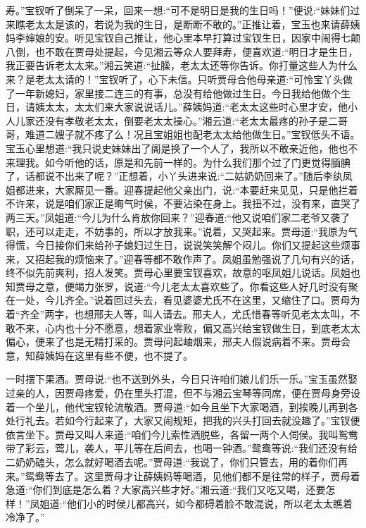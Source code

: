 \begin{parag}
寿。”宝钗听了倒呆了一呆，回来一想:“可不是明日是我的生日吗！”便说:“妹妹们过来瞧老太太是该的，若说为我的生日，是断断不敢的。”正推让着，宝玉也来请薛姨妈李婶娘的安。听见宝钗自己推让，他心里本早打算过宝钗生日，因家中闹得七颠八倒，也不敢在贾母处提起，今见湘云等众人要拜寿，便喜欢道:“明日才是生日，我正要告诉老太太来。”湘云笑道:“扯臊，老太太还等你告诉。你打量这些人为什么来？是老太太请的！”宝钗听了，心下未信。只听贾母合他母亲道:“可怜宝丫头做了一年新媳妇，家里接二连三的有事，总没有给他做过生日。今日我给他做个生日，请姨太太，太太们来大家说说话儿。”薛姨妈道:“老太太这些时心里才安，他小人儿家还没有孝敬老太太，倒要老太太操心。”湘云道:“老太太最疼的孙子是二哥哥，难道二嫂子就不疼了么！况且宝姐姐也配老太太给他做生日。”宝钗低头不语。宝玉心里想道:“我只说史妹妹出了阁是换了一个人了，我所以不敢亲近他，他也不来理我。如今听他的话，原是和先前一样的。为什么我们那个过了门更觉得腼腆了，话都说不出来了呢？”正想着，小丫头进来说:“二姑奶奶回来了。”随后李纨凤姐都进来，大家厮见一番。迎春提起他父亲出门，说:“本要赶来见见，只是他拦着不许来，说是咱们家正是晦气时侯，不要沾染在身上。我扭不过，没有来，直哭了两三天。”凤姐道:“今儿为什么肯放你回来？”迎春道:“他又说咱们家二老爷又袭了职，还可以走走，不妨事的，所以才放我来。”说着，又哭起来。贾母道:“我原为气得慌，今日接你们来给孙子媳妇过生日，说说笑笑解个闷儿。你们又提起这些烦事来，又招起我的烦恼来了。”迎春等都不敢作声了。凤姐虽勉强说了几句有兴的话，终不似先前爽利，招人发笑。贾母心里要宝钗喜欢，故意的呕凤姐儿说话。凤姐也知贾母之意，便竭力张罗，说道:“今儿老太太喜欢些了。你看这些人好几时没有聚在一处，今儿齐全。”说着回过头去，看见婆婆尤氏不在这里，又缩住了口。贾母为着“齐全”两字，也想邢夫人等，叫人请去。邢夫人，尤氏惜春等听见老太太叫，不敢不来，心内也十分不愿意，想着家业零败，偏又高兴给宝钗做生日，到底老太太偏心，便来了也是无精打采的。贾母问起岫烟来，邢夫人假说病着不来。贾母会意，知薛姨妈在这里有些不便，也不提了。
\end{parag}


\begin{parag}
    一时摆下果酒。贾母说:“也不送到外头，今日只许咱们娘儿们乐一乐。”宝玉虽然娶过亲的人，因贾母疼爱，仍在里头打混，但不与湘云宝琴等同席，便在贾母身旁设着一个坐儿，他代宝钗轮流敬酒。贾母道:“如今且坐下大家喝酒，到挨晚儿再到各处行礼去。若如今行起来了，大家又闹规矩，把我的兴头打回去就没趣了。”宝钗便依言坐下。贾母又叫人来道:“咱们今儿索性洒脱些，各留一两个人伺侯。我叫鸳鸯带了彩云，莺儿，袭人，平儿等在后间去，也喝一钟酒。”鸳鸯等说:“我们还没有给二奶奶磕头，怎么就好喝酒去呢。”贾母道:“我说了，你们只管去，用的着你们再来。”鸳鸯等去了。这里贾母才让薛姨妈等喝酒，见他们都不是往常的样子，贾母着急道:“你们到底是怎么着？大家高兴些才好。”湘云道:“我们又吃又喝，还要怎样！”凤姐道:“他们小的时侯儿都高兴，如今都碍着脸不敢混说，所以老太太瞧着冷净了。”
\end{parag}


